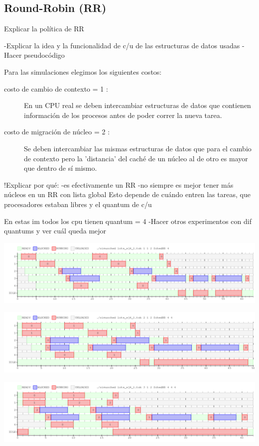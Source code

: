 \subsection{Round-Robin (RR)}
Explicar la política de RR

-Explicar la idea y la funcionalidad de c/u de las
estructuras de datos usadas
-Hacer pseudocódigo

Para las simulaciones elegimos los siguientes costos:
\begin{description}
 \item[costo de cambio de contexto = 1 :]{En un CPU real se deben intercambiar estructuras de datos que contienen información de los procesos antes de poder correr la nueva tarea.}
 \item[costo de migración de núcleo = 2 :]{Se deben intercambiar las mismas estructuras de datos que para el cambio de contexto pero la 'distancia' del caché de un núcleo al de otro es mayor que dentro de sí mismo.}
\end{description}

!Explicar por qué: 
-es efectivamente un RR
-no siempre es mejor tener más núcleos en un RR con lista global
Esto depende de cuándo entren las tareas, que procesadores
estaban libres y el quantum de c/u

En estas im todos los cpu tienen quantum = 4
-Hacer otros experimentos con dif quantums y ver cuál queda mejor

\begin{center}
 \includegraphics[scale=0.5]{./RR/RR_1cpu.png}
\end{center}

\begin{center}
 \includegraphics[scale=0.5]{./RR/RR_2cpu.png}
\end{center}

\begin{center}
 \includegraphics[scale=0.5]{./RR/RR_3cpu.png}
\end{center}

